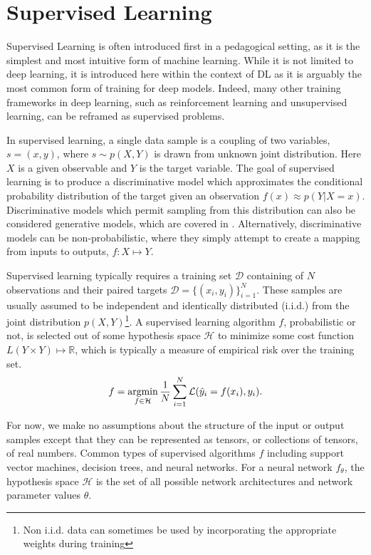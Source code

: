 \section{Supervised Learning}

Supervised Learning is often introduced first in a pedagogical setting, as it is the simplest and most intuitive form of machine learning. While it is not limited to deep learning, it is introduced here within the context of DL as it is arguably the most common form of training for deep models. Indeed, many other training frameworks in deep learning, such as reinforcement learning and unsupervised learning, can be reframed as supervised problems.

In supervised learning, a single data sample is a coupling of two variables, $s = (x, y)$, where $s \sim p(X, Y)$ is drawn from unknown joint distribution.
Here $X$ is a given observable and $Y$ is the target variable.
The goal of supervised learning is to produce a discriminative model which approximates the conditional probability distribution of the target given an observation $f(x) \approx p(Y|X=x)$.
Discriminative models which permit sampling from this distribution can also be considered generative models, which are covered in .
Alternatively, discriminative models can be non-probabilistic, where they simply attempt to create a mapping from inputs to outputs, $f: X \mapsto Y$.

Supervised learning typically requires a training set $\mathcal{D}$ containing of $N$ observations and their paired targets $\mathcal{D} = \{(x_i, y_i)\}_{i=1}^N$.
These samples are usually assumed to be independent and identically distributed (i.i.d.) from the joint distribution $p(X, Y)$\footnote{Non i.i.d. data can sometimes be used by incorporating the appropriate weights during training}.
A supervised learning algorithm $f$, probabilistic or not, is selected out of some hypothesis space $\mathcal{H}$ to minimize some cost function $L(Y \times Y) \mapsto \mathbb{R}$, which is typically a measure of empirical risk over the training set.
\begin{equation}
    f = \operatorname*{argmin}_{f \in \mathcal{H}} \frac{1}{N} \sum_{i=1}^N \mathcal{L}(\hat{y}_i = f(x_i), y_i).
\end{equation}

For now, we make no assumptions about the structure of the input or output samples except that they can be represented as tensors, or collections of tensors, of real numbers.
Common types of supervised algorithms $f$ including support vector machines, decision trees, and neural networks.
For a neural network $f_{\theta}$, the hypothesis space $\mathcal{H}$ is the set of all possible network architectures and network parameter values $\theta$.

